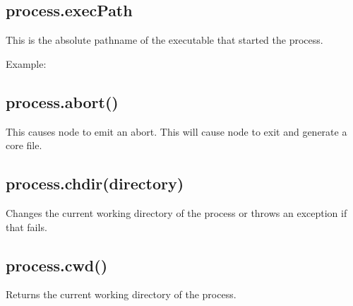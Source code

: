 \subsection{process.execPath}

This is the absolute pathname of the executable that started the
process.

Example:

\begin{Shaded}
\begin{Highlighting}[]
\end{Highlighting}
\end{Shaded}

\subsection{process.abort()}

This causes node to emit an abort. This will cause node to exit and
generate a core file.

\subsection{process.chdir(directory)}

Changes the current working directory of the process or throws an
exception if that fails.

\begin{Shaded}
\begin{Highlighting}[]
\NormalTok{(} \NormalTok{+ }\NormalTok{());}
 \NormalTok{\{}
  \NormalTok{(}\NormalTok{);}
  \NormalTok{(} \NormalTok{+ }\NormalTok{());}
\NormalTok{\}}
 
  \NormalTok{(} 
\NormalTok{\}}
\end{Highlighting}
\end{Shaded}

\subsection{process.cwd()}

Returns the current working directory of the process.

